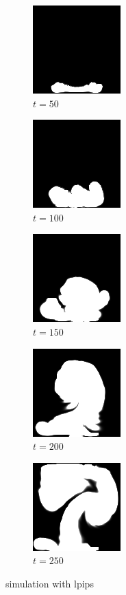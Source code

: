 \documentclass[a4paper,12pt,twoside]{report}
\begin{document}
\begin{figure}
\centering
\begin{subfigure}{0.18\textwidth}
  \centering
  \includegraphics[scale=0.56]{buoyancy/dens_000050_lpips.png}
  \caption{$t=50$}
\end{subfigure}
\begin{subfigure}{0.18\textwidth}
  \centering
  \includegraphics[scale=0.56]{buoyancy/dens_000100_lpips.png}
  \caption{$t=100$}
\end{subfigure}
\begin{subfigure}{0.18\textwidth}
  \centering
  \includegraphics[scale=0.56]{buoyancy/dens_000150_lpips.png}
  \caption{$t=150$}
\end{subfigure}
\begin{subfigure}{0.18\textwidth}
  \centering
  \includegraphics[scale=0.56]{buoyancy/dens_000200_lpips.png}
  \caption{$t=200$}
\end{subfigure}
\begin{subfigure}{0.18\textwidth}
  \centering
  \includegraphics[scale=0.56]{buoyancy/dens_000249_lpips.png}
  \caption{$t=250$}
\end{subfigure}
\caption{simulation with lpips}
\end{figure}
\end{document}
